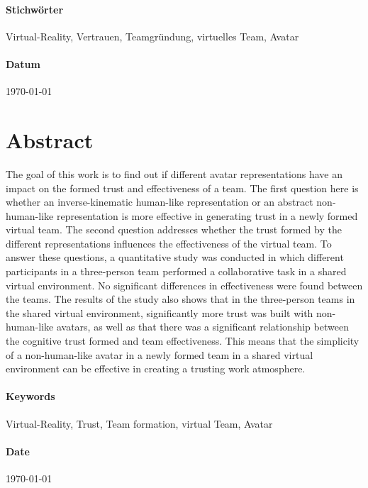 \documentclass[a4paper,11pt]{article}%
\renewcommand{\\}{\vspace*{0.5\baselineskip} \newline}
\begin{document}
			\paragraph{Stichwörter}
			Virtual-Reality, Vertrauen, Teamgründung, virtuelles Team, Avatar
			
			\paragraph{Datum}
			{\today}
	\newpage
	
\section*{Abstract}
The goal of this work is to find out if different avatar representations have an impact on the formed trust and effectiveness of a team. The first question here is whether an inverse-kinematic human-like representation or an abstract non-human-like representation is more effective in generating trust in a newly formed virtual team. The second question addresses whether the trust formed by the different representations influences the effectiveness of the virtual team. To answer these questions, a quantitative study was conducted in which different participants in a three-person team performed a collaborative task in a shared virtual environment. No significant differences in effectiveness were found between the teams. The results of the study also shows that in the three-person teams in the shared virtual environment, significantly more trust was built with non-human-like avatars, as well as that there was a significant relationship between the cognitive trust formed and team effectiveness. This means that the simplicity of a non-human-like avatar in a newly formed team in a shared virtual environment can be effective in creating a trusting work atmosphere.
	
			\paragraph{Keywords}
			Virtual-Reality, Trust, Team formation, virtual Team, Avatar
			
			\paragraph{Date}
			{\today}
	\newpage
	\tableofcontents
	\newpage

\listoffigures%
\newpage
\listoftables%
\newpage
	
\end{document}
